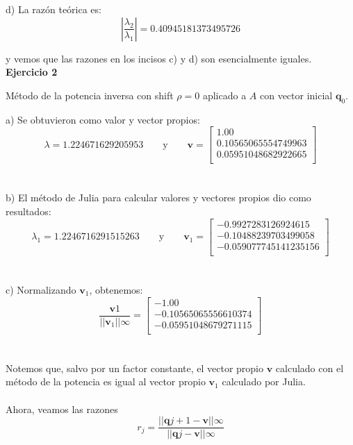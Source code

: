 \documentclass[11pt]{article}
\begin{document}
d) La razón teórica es:
$$
\left| \frac{\lambda_2}{\lambda_1} \right| = 0.40945181373495726
$$

y vemos que las razones en los incisos c) y d) son esencialmente iguales.
\\

\noindent
\textbf{Ejercicio 2}

\noindent
Método de la potencia inversa con shift $\rho = 0$ aplicado a $A$ con vector inicial $\textbf{q}_0$.

a) Se obtuvieron como valor y vector propios:
 \[
 \lambda = 1.224671629205953
 \qquad\text{y}\qquad
 \textbf{v} = \begin{bmatrix}
1.00 \\
0.10565065554749963 \\
0.05951048682922665 \\
\end{bmatrix}
 \]
 \\
 \\

b) El método de Julia para calcular valores y vectores propios dio como resultados:
\[
 \lambda_1 = 1.2246716291515263
 \qquad\text{y}\qquad
 \textbf{v}_1 = \begin{bmatrix}
-0.9927283126924615 \\
-0.10488239703499058 \\
-0.059077745141235156 \\
\end{bmatrix}
 \]
 \\
 \\

 c) Normalizando $\textbf{v}_1$, obtenemos:
 $$\frac{\textbf{v}1}{||\textbf{v}_1||\infty} =
\begin{bmatrix}
-1.00 \\
-0.10565065556610374 \\
-0.05951048679271115 \\
\end{bmatrix}$$
\\
\\

Notemos que, salvo por un factor constante, el vector propio $\textbf{v}$ calculado con el método de la potencia es igual al vector propio $\textbf{v}_1$ calculado por Julia.
\\
\\

Ahora, veamos las razones
$$
r_j = \frac{||\textbf{q}{j+1} - \textbf{v}||\infty}{||\textbf{q}{j} - \textbf{v}||\infty}
$$
\\
\end{document}
